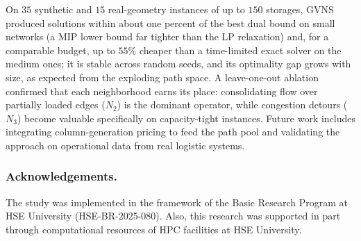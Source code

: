 \documentclass[runningheads]{llncs}
\begin{document}
On $35$ synthetic and $15$ real-geometry instances of up to $150$ storages,
GVNS produced solutions within about one percent of the best dual bound on
small networks (a MIP lower bound far tighter than the LP relaxation) and, for a
comparable budget, up to $55\%$ cheaper than a time-limited exact solver on the
medium ones; it is stable across random seeds, and its optimality gap grows with
size, as expected from the exploding path space. A leave-one-out ablation
confirmed that each neighborhood earns its place: consolidating flow over
partially loaded edges ($N_2$) is the dominant operator, while congestion detours
($N_3$) become valuable specifically on capacity-tight instances. Future work
includes integrating column-generation pricing to feed the path pool and
validating the approach on operational data from real logistic systems.

\subsubsection*{Acknowledgements.}
The study was implemented in the framework of the Basic Research Program at
HSE University (HSE-BR-2025-080).
Also, this research was supported in part through computational resources of HPC facilities at HSE University.
\end{document}
